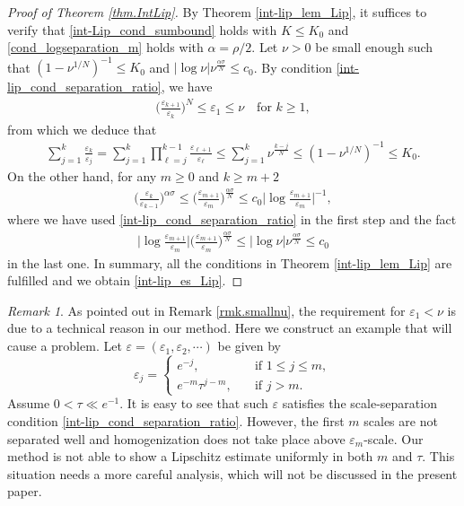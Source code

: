 \documentclass[reqno,12pt]{amsart} %
\theoremstyle{definition}
\theoremstyle{remark}
\newtheorem{remark}[theorem]{Remark}
\numberwithin{equation}{section}
\newcommand{\e}{\varepsilon}
\begin{document}
\begin{proof}[Proof of Theorem \ref{thm.IntLip}]
  By Theorem \ref{int-lip_lem_Lip}, it suffices to verify that \eqref{int-Lip_cond_sumbound} holds with $K\leq K_0$ and \eqref{cond_logseparation_m} holds with $\alpha=\rho/2$. Let $\nu>0$ be small enough such that $(1-\nu^{1/N})^{-1}\leq K_0$ and $|\log \nu|\nu^{\frac{\alpha\sigma}{N}}\leq c_0$. By condition \eqref{int-lip_cond_separation_ratio}, we have
  \begin{align*}
    \Big(\frac{\varepsilon_{k+1}}{\varepsilon_{k}}\Big)^N\leq \varepsilon_1\leq \nu\quad \text{for }k\geq 1,
  \end{align*}
  from which we deduce that
  \begin{align*}
    \sum_{j=1}^k\frac{\varepsilon_k}{\varepsilon_j}=\sum_{j=1}^k\prod_{\ell=j}^{k-1}\frac{\varepsilon_{\ell+1}}{\varepsilon_{\ell}}\leq \sum_{j=1}^k\nu^{\frac{k-j}{N}}\leq (1-\nu^{1/N})^{-1}\leq K_0.
  \end{align*}
On the other hand, for any $m\geq 0$ and $k\geq m+2$
  \begin{align*}
    \bigg(\frac{\varepsilon_k}{\varepsilon_{k-1}}\bigg)^{\alpha\sigma}\leq \Big(\frac{\varepsilon_{m+1}}{\varepsilon_m}\Big)^{\frac{\alpha\sigma}{N}}\leq c_0\Big|\log\frac{\varepsilon_{m+1}}{\varepsilon_m}\Big|^{-1},
  \end{align*}
where we have used \eqref{int-lip_cond_separation_ratio} in the first step and the fact
\begin{align*}
  \Big|\log\frac{\varepsilon_{m+1}}{\varepsilon_m}\Big|\Big(\frac{\varepsilon_{m+1}}{\varepsilon_m}\Big)^{\frac{\alpha\sigma}{N}}\leq |\log \nu|\nu^{\frac{\alpha\sigma}{N}}\leq c_0
\end{align*}
in the last one. In summary, all the conditions in Theorem \ref{int-lip_lem_Lip} are fulfilled and we obtain \eqref{int-lip_es_Lip}.
\end{proof}

\begin{remark}\label{rmk.illExample}
    As pointed out in Remark \ref{rmk.smallnu}, the requirement for $\e_1 < \nu$ is due to a technical reason in our method. Here we construct an example that will cause a problem. Let $\e = (\e_1, \e_2,\cdots)$ be given by
    \begin{equation*}
        \e_j = 
        \begin{cases}
            e^{-j}, \quad & \text{if } 1\le j\le m,\\
            e^{-m} \tau^{j-m}, \quad & \text{if } j > m.
        \end{cases}
    \end{equation*}
    Assume $0<\tau \ll e^{-1}$. It is easy to see that such $\e$ satisfies the scale-separation condition \eqref{int-lip_cond_separation_ratio}. However, the first $m$ scales are not separated well and homogenization does not take place above $\e_m$-scale. Our method is not able to show a Lipschitz estimate uniformly in both $m$ and $\tau$. This situation needs a more careful analysis, which will not be discussed in the present paper.
\end{remark}
\end{document}
